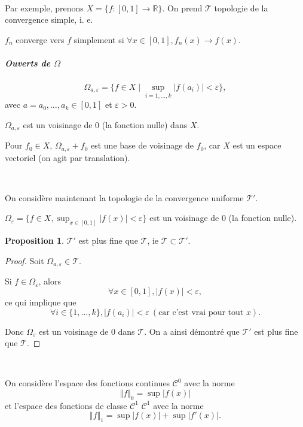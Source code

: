 \documentclass[french]{book}
\theoremstyle{definition}
\newtheorem{protoproposition}{Proposition}[section]
\newenvironment{prop}
    {\colorlet{shadecolor}{blue!5}\begin{shaded}\begin{protoproposition}}
    {\end{protoproposition}\end{shaded}}
\theoremstyle{remark}
\newcommand{\lesss}{<}
\newcommand{\less}{\lesss}
\newcommand{\biggg}{>}
\newcommand{\bg}{\biggg}
\begin{document}
\

Par exemple, prenons $X = \{ f :[0, 1] \to \mathbb{R} \} $. On prend $\mathscr{T} $ topologie de la convergence simple, i. e.

$f_n $ converge vers $ f$ simplement si $\forall x \in [0, 1], f_n(x) \to f(x)$.

\subparagraph{Ouverts de $\Omega$}

$$\Omega _{a, \varepsilon } = \{ f \in X \mid \sup _{i =1, \dots, k} \lvert f(a_i) \rvert \less \varepsilon \}, $$ avec $a = a_0, \dots, a_k \in [0, 1]$ et $\varepsilon  \bg 0$.

$\Omega _{a, \varepsilon } $ est un voisinage de 0 (la fonction nulle) dans $X$.

Pour $f_0 \in X$, $\Omega _{a, \varepsilon } + f_0$ est une base de voisinage de $f_0$, car $X$ est un espace vectoriel (on agit par translation).

\

On considère maintenant la topologie de la convergence uniforme $\mathscr{T}' $.

$\Omega _{\varepsilon } = \{ f \in X, \sup_{ x \in [0, 1] } \lvert f(x) \rvert \less \varepsilon   \} $ est un voisinage de $0$ (la fonction nulle).

\begin{prop}
  $\mathscr{T}' $ est plus fine que $\mathscr{T} $, ie $\mathscr{T} \subset \mathscr{T}' $.
\end{prop}

\begin{proof}
  Soit $\Omega _{a, \varepsilon } \in \mathscr{T}  $.


  Si $f \in \Omega _{\varepsilon }$, alors $$\forall x \in [0, 1], \lvert f(x) \rvert \less \varepsilon, $$ ce qui implique que $$ \forall i \in \{ 1, \dots, k \}, \lvert f(a_i) \rvert \less \varepsilon \ (\text{car c'est vrai pour tout } x). $$

   Donc $\Omega  _{\varepsilon } $ est un voisinage de 0 dans $\mathscr{T} $. On a ainsi démontré que $\mathscr{T}' $ est plus fine que $\mathscr{T} $.

\end{proof}

\

On considère l'espace des fonctions continues $\mathcal{C}^0$ avec la norme $$ \Vert f \Vert _{0} = \sup_{  } \lvert f(x) \rvert $$ et l'espace des fonctions de classe $\mathcal{C}^1$ $\mathcal{C}^1$ avec la norme $$\Vert f \Vert _{1} = \sup \lvert f(x) \rvert + \sup \lvert f'(x) \rvert.$$
\end{document}
